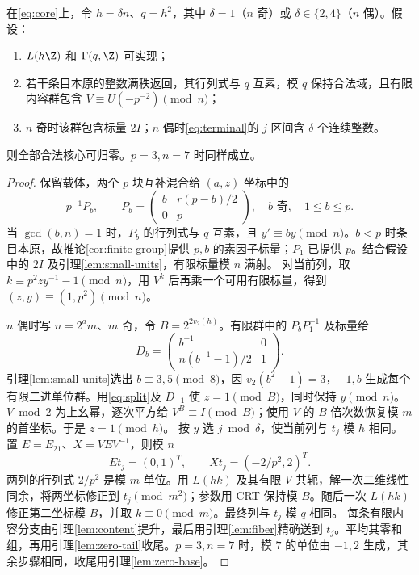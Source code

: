 \begin{theorem}\label{thm:terminal}
在\eqref{eq:core}上，令 $h=\delta n$、$q=h^2$，其中 $\delta=1$（$n$ 奇）或 $\delta\in\{2,4\}$（$n$ 偶）。假设：
\begin{enumerate}
\item $L(h\Z)$ 和 $\Gamma(q,\Z)$ 可实现；
\item 若干条目本原的整数满秩返回，其行列式与 $q$ 互素，模 $q$ 保持合法域，且有限内容群包含 $V\equiv U(-p^{-2})\pmod n$；
\item $n$ 奇时该群包含标量 $2I$；$n$ 偶时\eqref{eq:terminal}的 $j$ 区间含 $\delta$ 个连续整数。
\end{enumerate}
则全部合法核心可归零。$p=3,n=7$ 时同样成立。
\end{theorem}
\begin{proof}
保留载体，两个 $p$ 块互补混合给 $(a,z)$ 坐标中的
\[
p^{-1}P_b,\qquad P_b=\begin{pmatrix}b&r(p-b)/2\\0&p\end{pmatrix},
\quad b\text{ 奇},\quad1\le b\le p.
\]
当 $\gcd(b,n)=1$ 时，$P_b$ 的行列式与 $q$ 互素，且 $y'\equiv by\pmod n$。$b<p$ 时条目本原，故推论\ref{cor:finite-group}提供 $p,b$ 的素因子标量；$P_1$ 已提供 $p$。结合假设中的 $2I$ 及引理\ref{lem:small-units}，有限标量模 $n$ 满射。
对当前列，取 $k\equiv p^2zy^{-1}-1\pmod n$，用 $V^k$ 后再乘一个可用有限标量，得到 $(z,y)\equiv(1,p^2)\pmod n$。

$n$ 偶时写 $n=2^a m$、$m$ 奇，令 $B=2^{2v_2(h)}$。有限群中的 $P_bP_1^{-1}$ 及标量给
\begin{equation}\label{eq:split}
D_b=\begin{pmatrix}b^{-1}&0\\n(b^{-1}-1)/2&1\end{pmatrix}.
\end{equation}
引理\ref{lem:small-units}选出 $b\equiv3,5\pmod8$，因 $v_2(b^2-1)=3$，$-1,b$ 生成每个有限二进单位群。用\eqref{eq:split}及 $D_{-1}$ 使 $z=1\pmod B$，同时保持 $y\pmod n$。$V\bmod2$ 为上幺幂，逐次平方给 $V^B\equiv I\pmod B$；使用 $V$ 的 $B$ 倍次数恢复模 $m$ 的首坐标。于是 $z=1\pmod h$。
按 $y$ 选 $j\bmod\delta$，使当前列与 $t_j$ 模 $h$ 相同。置 $E=E_{21}$、$X=VEV^{-1}$，则模 $n$
\[
Et_j=(0,1)^T,\qquad Xt_j=(-2/p^2,2)^T.
\]
两列的行列式 $2/p^2$ 是模 $m$ 单位。用 $L(hk)$ 及其有限 $V$ 共轭，解一次二维线性同余，将两坐标修正到 $t_j\pmod{m^2}$；参数用 CRT 保持模 $B$。随后一次 $L(hk)$ 修正第二坐标模 $B$，并取 $k\equiv0\pmod m$。最终列与 $t_j$ 模 $q$ 相同。
每条有限内容分支由引理\ref{lem:content}提升，最后用引理\ref{lem:fiber}精确送到 $t_j$。平均其零和组，再用引理\ref{lem:zero-tail}收尾。$p=3,n=7$ 时，模 $7$ 的单位由 $-1,2$ 生成，其余步骤相同，收尾用引理\ref{lem:zero-base}。
\end{proof}

